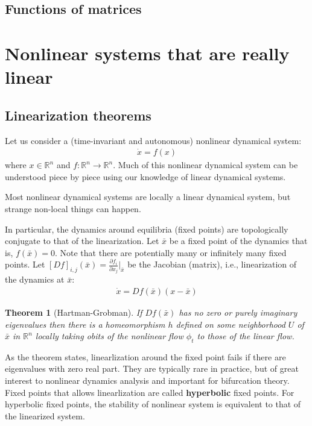 \documentclass[a4paper,11pt]{exam}
\newtheorem{theorem}{Theorem}
\newcounter{ct}
\newcommand{\field}[1]{\ensuremath{\mathbb{#1}}}
\newcommand{\reals}{\field{R}}
\begin{document}
\begin{questions}
\subsection{Functions of matrices}

\newpage
\section{Nonlinear systems that are really linear}
\subsection{Linearization theorems}
Let us consider a (time-invariant and autonomous) nonlinear dynamical system:
\begin{align}
    \dot{x} = f(x)
\end{align}
where $x \in \reals^n$ and $f: \reals^n \to \reals^n$.
Much of this nonlinear dynamical system can be understood piece by piece using our knowledge of linear dynamical systems.

\begin{tcolorbox}[colback=black!1!,title=Linearize that beast!]
    Most nonlinear dynamical systems are locally a linear dynamical system, but strange non-local things can happen.
\end{tcolorbox}

In particular, the dynamics around equilibria (fixed points) are topologically conjugate to that of the linearization.
Let $\bar{x}$ be a fixed point of the dynamics that is, $f(\bar{x}) = 0$.
Note that there are potentially many or infinitely many fixed points.
Let $[Df]_{i,j}(\bar{x}) = \frac{\partial f_i}{\partial x_j}\bigr\rvert_{\bar{x}}$ be the Jacobian (matrix), i.e., linearization of the dynamics at $\bar{x}$:
\begin{align}\label{eq:linearized_around_FP}
    \dot{x} = Df(\bar{x}) (x - \bar{x})
\end{align}


\begin{theorem}[Hartman-Grobman]
    If $Df(\bar{x})$ has no zero or purely imaginary eigenvalues then there is a homeomorphism $h$ defined on some neighborhood $U$ of $\bar{x}$ in $\reals^n$ locally taking obits of the nonlinear flow $\phi_t$ to those of the linear flow.
\end{theorem}
As the theorem states, linearlization around the fixed point fails if there are eigenvalues with zero real part.
They are typically rare in practice, but of great interest to nonlinear dynamics analysis and important for bifurcation theory.
Fixed points that allows linearlization are called \textbf{hyperbolic} fixed points.
For hyperbolic fixed points, the stability of nonlinear system is equivalent to that of the linearized system.


\end{questions}
\end{document}

